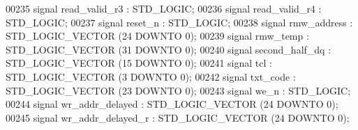 \begin{DoxyCode}
00235                 \textcolor{keywordflow}{signal} \textcolor{vhdlchar}{read_valid_r3} \textcolor{vhdlchar}{:}  \textcolor{comment}{STD\_LOGIC};
00236                 \textcolor{keywordflow}{signal} \textcolor{vhdlchar}{read_valid_r4} \textcolor{vhdlchar}{:}  \textcolor{comment}{STD\_LOGIC};
00237                 \textcolor{keywordflow}{signal} \textcolor{vhdlchar}{reset_n} \textcolor{vhdlchar}{:}  \textcolor{comment}{STD\_LOGIC};
00238                 \textcolor{keywordflow}{signal} \textcolor{vhdlchar}{rmw_address} \textcolor{vhdlchar}{:}  \textcolor{comment}{STD\_LOGIC\_VECTOR} \textcolor{vhdlchar}{(}\textcolor{vhdllogic}{}\textcolor{vhdllogic}{24} \textcolor{keywordflow}{DOWNTO} \textcolor{vhdllogic}{}\textcolor{vhdllogic}{0}\textcolor{vhdlchar}{)};
00239                 \textcolor{keywordflow}{signal} \textcolor{vhdlchar}{rmw_temp} \textcolor{vhdlchar}{:}  \textcolor{comment}{STD\_LOGIC\_VECTOR} \textcolor{vhdlchar}{(}\textcolor{vhdllogic}{}\textcolor{vhdllogic}{31} \textcolor{keywordflow}{DOWNTO} \textcolor{vhdllogic}{}\textcolor{vhdllogic}{0}\textcolor{vhdlchar}{)};
00240                 \textcolor{keywordflow}{signal} \textcolor{vhdlchar}{second_half_dq} \textcolor{vhdlchar}{:}  \textcolor{comment}{STD\_LOGIC\_VECTOR} \textcolor{vhdlchar}{(}\textcolor{vhdllogic}{}\textcolor{vhdllogic}{15} \textcolor{keywordflow}{DOWNTO} \textcolor{vhdllogic}{}\textcolor{vhdllogic}{0}\textcolor{vhdlchar}{)};
00241                 \textcolor{keywordflow}{signal} \textcolor{vhdlchar}{tcl} \textcolor{vhdlchar}{:}  \textcolor{comment}{STD\_LOGIC\_VECTOR} \textcolor{vhdlchar}{(}\textcolor{vhdllogic}{}\textcolor{vhdllogic}{3} \textcolor{keywordflow}{DOWNTO} \textcolor{vhdllogic}{}\textcolor{vhdllogic}{0}\textcolor{vhdlchar}{)};
00242                 \textcolor{keywordflow}{signal} \textcolor{vhdlchar}{txt_code} \textcolor{vhdlchar}{:}  \textcolor{comment}{STD\_LOGIC\_VECTOR} \textcolor{vhdlchar}{(}\textcolor{vhdllogic}{}\textcolor{vhdllogic}{23} \textcolor{keywordflow}{DOWNTO} \textcolor{vhdllogic}{}\textcolor{vhdllogic}{0}\textcolor{vhdlchar}{)};
00243                 \textcolor{keywordflow}{signal} \textcolor{vhdlchar}{we_n} \textcolor{vhdlchar}{:}  \textcolor{comment}{STD\_LOGIC};
00244                 \textcolor{keywordflow}{signal} \textcolor{vhdlchar}{wr_addr_delayed} \textcolor{vhdlchar}{:}  \textcolor{comment}{STD\_LOGIC\_VECTOR} \textcolor{vhdlchar}{(}\textcolor{vhdllogic}{}\textcolor{vhdllogic}{24} \textcolor{keywordflow}{DOWNTO} \textcolor{vhdllogic}{}\textcolor{vhdllogic}{0}\textcolor{vhdlchar}{)};
00245                 \textcolor{keywordflow}{signal} \textcolor{vhdlchar}{wr_addr_delayed_r} \textcolor{vhdlchar}{:}  \textcolor{comment}{STD\_LOGIC\_VECTOR} \textcolor{vhdlchar}{(}\textcolor{vhdllogic}{}\textcolor{vhdllogic}{24} \textcolor{keywordflow}{DOWNTO} \textcolor{vhdllogic}{}\textcolor{vhdllogic}{0}\textcolor{vhdlchar}{)};

\end{DoxyCode}

